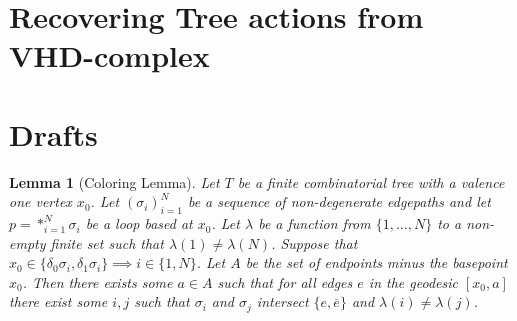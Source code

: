 \documentclass{article}
\theoremstyle{mystyle}
\newtheorem{lem}{Lemma}[section]
\theoremstyle{remark}
\begin{document}
\section{Recovering Tree actions from VHD-complex}

\newpage
\section{Drafts}
\begin{lem}
	[Coloring Lemma]
	Let \(T\) be a finite combinatorial tree with a valence one vertex \(x_{0}\). Let \((\sigma_{i} )_{i=1}^{N}\) be a sequence of non-degenerate edgepaths and let \(p = *_{i=1}^{N} \sigma_{i}\) be a loop based at \(x_{0}\). Let \(\lambda\) be a function from \(\{1,\ldots,N\}\) to a non-empty finite set such that \(\lambda (1) \neq \lambda (N)\). Suppose that \(x_{0} \in \{\delta_{0} \sigma_{i} , \delta_{1} \sigma_{i} \} \implies i \in \{1,N\}\). Let \(A\) be the set of endpoints minus the basepoint \(x_{ 0}\). Then there exists some \(a \in A\) such that for all edges \(e\) in the geodesic \([x_{0} , a]\) there exist some \(i, j\) such that \(\sigma_{i}\) and \(\sigma_{j}\) intersect \(\{e,\overline{e}\}\) and \(\lambda ( i ) \neq \lambda ( j )\).

\end{lem}
\end{document}
